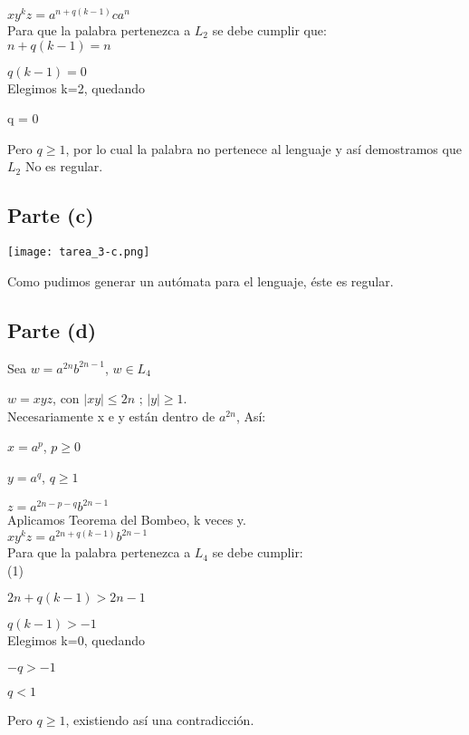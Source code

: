 \documentclass[11pt,letterpaper]{article}
\begin{document}
$xy^kz = a^{n+q(k-1)}ca^n$
 \\

Para que la palabra pertenezca a $L_{2}$ se debe cumplir que:
 \\
 
$n+q(k-1) = n$

$q(k-1) = 0$
 \\
 
Elegimos k=2, quedando

q = 0

Pero $q \geqslant 1$, por lo cual la palabra no pertenece al lenguaje y así demostramos que $L_{2}$ No es regular.

\subsection{Parte (c)}
\texttt{[image: tarea\_3-c.png]}

Como pudimos generar un autómata para el lenguaje, éste es regular.


\subsection{Parte (d)}
Sea $w = a^{2n}b^{2n-1}$, $w \in  L_{4}$

$w = xyz$, con $|xy| \leqslant 2n$ ; $|y| \geqslant 1$.
 \\

Necesariamente x e y están dentro de $a^{2n}$, Así:

$x = a^p$, $p \geqslant 0$

$y = a^q$, $q \geqslant 1$

$z = a^{2n-p-q}b^{2n-1}$
 \\

Aplicamos Teorema del Bombeo, k veces y.
 \\
 
$xy^kz = a^{2n+q(k-1)}b^{2n-1}$
 \\

Para que la palabra pertenezca a $L_{4}$ se debe cumplir:
 \\
 
(1)

$2n+q(k-1) > 2n-1$

$q(k-1) > -1$
 \\
 
Elegimos k=0, quedando

$-q > -1$

$q < 1$

Pero $q \geqslant 1$, existiendo así una contradicción.
 \\
 
\end{document}
